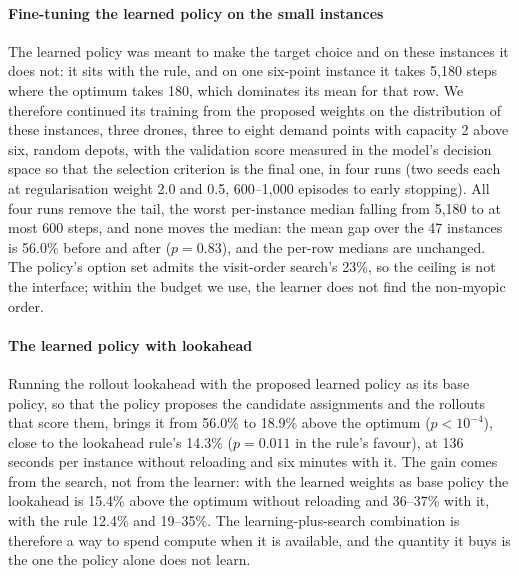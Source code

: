 \documentclass[final,5p,times,twocolumn]{elsarticle}
\begin{document}
\paragraph{Fine-tuning the learned policy on the small instances}
The learned policy was meant to make the target choice and on these instances it does not: it
sits with the rule, and on one six-point instance it takes 5{,}180 steps where the optimum takes
180, which dominates its mean for that row. We therefore continued its training from the proposed
weights on the distribution of these instances, three drones, three to eight demand points with
capacity 2 above six, random depots, with the validation score measured in the model's decision
space so that the selection criterion is the final one, in four runs (two seeds each at
regularisation weight 2.0 and 0.5, 600--1{,}000 episodes to early stopping). All four runs
remove the tail, the worst per-instance median falling from 5{,}180 to at most 600 steps, and none
moves the median: the mean gap over the 47 instances is 56.0\% before and after ($p = 0.83$), and
the per-row medians are unchanged. The policy's option set admits the visit-order search's 23\%, so
the ceiling is not the interface; within the budget we use, the learner does not find the
non-myopic order.

\paragraph{The learned policy with lookahead}
Running the rollout lookahead with the proposed learned policy as its base policy, so that the
policy proposes the candidate assignments and the rollouts that score them, brings it from
56.0\% to 18.9\% above the optimum ($p < 10^{-4}$), close to the lookahead rule's 14.3\%
($p = 0.011$ in the rule's favour), at 136 seconds per instance without reloading and six
minutes with it. The gain comes from the search, not from the learner: with the learned weights
as base policy the lookahead is 15.4\% above the optimum without reloading and 36--37\% with it,
with the rule 12.4\% and 19--35\%. The learning-plus-search combination is therefore a
way to spend compute when it is available, and the quantity it buys is the one the policy alone
does not learn.
\end{document}
